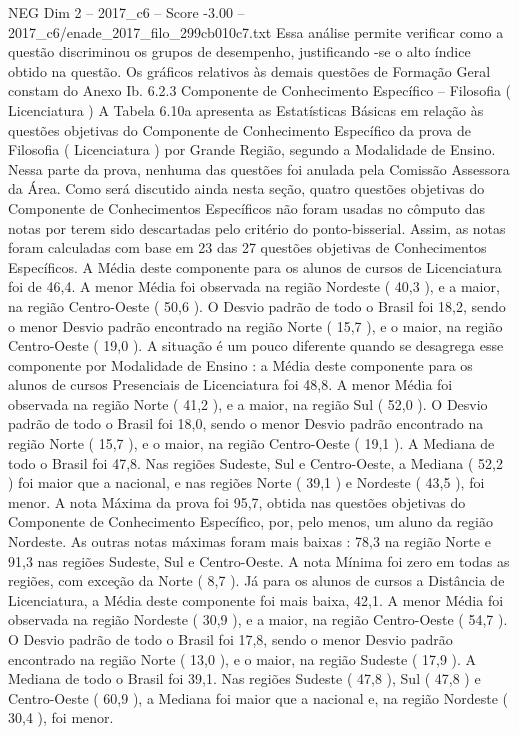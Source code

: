 \begin{textsample}{NEG Dim 2 – 2017\_c6 – Score -3.00 – 2017\_c6/enade\_2017\_filo\_299cb010c7.txt}
Essa análise permite verificar como a questão discriminou os grupos de desempenho, justificando -se o alto índice obtido na questão.
Os gráficos relativos às demais questões de Formação Geral constam do Anexo Ib. 6.2.3 Componente de Conhecimento Específico – Filosofia ( Licenciatura ) A Tabela 6.10a apresenta as Estatísticas Básicas em relação às questões objetivas do Componente de Conhecimento Específico da prova de Filosofia ( Licenciatura ) por Grande Região, segundo a Modalidade de Ensino.
Nessa parte da prova, nenhuma das questões foi anulada pela Comissão Assessora da Área.
Como será discutido ainda nesta seção, quatro questões objetivas do Componente de Conhecimentos Específicos não foram usadas no cômputo das notas por terem sido descartadas pelo critério do ponto-bisserial.
Assim, as notas foram calculadas com base em 23 das 27 questões objetivas de Conhecimentos Específicos.
A Média deste componente para os alunos de cursos de Licenciatura foi de 46,4.
A menor Média foi observada na região Nordeste ( 40,3 ), e a maior, na região Centro-Oeste ( 50,6 ).
O Desvio padrão de todo o Brasil foi 18,2, sendo o menor Desvio padrão encontrado na região Norte ( 15,7 ), e o maior, na região Centro-Oeste ( 19,0 ).
A situação é um pouco diferente quando se desagrega esse componente por Modalidade de Ensino : a Média deste componente para os alunos de cursos Presenciais de Licenciatura foi 48,8.
A menor Média foi observada na região Norte ( 41,2 ), e a maior, na região Sul ( 52,0 ).
O Desvio padrão de todo o Brasil foi 18,0, sendo o menor Desvio padrão encontrado na região Norte ( 15,7 ), e o maior, na região Centro-Oeste ( 19,1 ).
A Mediana de todo o Brasil foi 47,8.
Nas regiões Sudeste, Sul e Centro-Oeste, a Mediana ( 52,2 ) foi maior que a nacional, e nas regiões Norte ( 39,1 ) e Nordeste ( 43,5 ), foi menor.
A nota Máxima da prova foi 95,7, obtida nas questões objetivas do Componente de Conhecimento Específico, por, pelo menos, um aluno da região Nordeste.
As outras notas máximas foram mais baixas : 78,3 na região Norte e 91,3 nas regiões Sudeste, Sul e Centro-Oeste.
A nota Mínima foi zero em todas as regiões, com exceção da Norte ( 8,7 ).
Já para os alunos de cursos a Distância de Licenciatura, a Média deste componente foi mais baixa, 42,1.
A menor Média foi observada na região Nordeste ( 30,9 ), e a maior, na região Centro-Oeste ( 54,7 ).
O Desvio padrão de todo o Brasil foi 17,8, sendo o menor Desvio padrão encontrado na região Norte ( 13,0 ), e o maior, na região Sudeste ( 17,9 ).
A Mediana de todo o Brasil foi 39,1.
Nas regiões Sudeste ( 47,8 ), Sul ( 47,8 ) e Centro-Oeste ( 60,9 ), a Mediana foi maior que a nacional e, na região Nordeste ( 30,4 ), foi menor.

\end{textsample}
